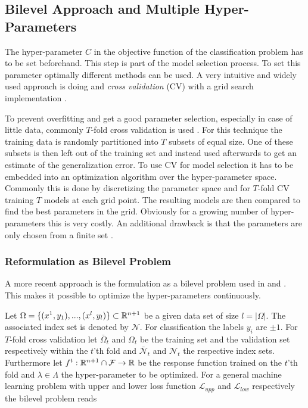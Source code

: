 \subsection{Bilevel Approach and Multiple Hyper-Parameters}


The hyper-parameter \(C\) in the objective function of the classification problem has to be set beforehand. This step is part of the model selection process.
To set this parameter optimally different methods can be used.
A very intuitive and widely used approach is doing  and \emph{cross validation} (CV) with a grid search implementation \cite[p. 30]{Kunapuli2008}.

To prevent overfitting and get a good parameter selection, especially in case of little data, commonly \(T\)-fold cross validation is used \cite[p. 30]{Kunapuli2008}.
For this technique the training data is randomly partitioned into \(T\) subsets of equal size. One of these subsets is then left out of the training set and instead used afterwards to get an estimate of the generalization error. 
To use CV for model selection it has to be embedded into an optimization algorithm over the hyper-parameter space. 
Commonly this is done by discretizing the parameter space and for \(T\)-fold CV training \(T\) models at each grid point. The resulting models are then compared to find the best parameters in the grid.
Obviously for a growing number of hyper-parameters this is very costly. An additional drawback is that the parameters are only chosen from a finite set \cite[p. 30]{Kunapuli2008}.

\subsubsection{Reformulation as Bilevel Problem}

A more recent approach is the formulation as a bilevel problem used in \cite{Kunapuli2008} and \cite{Moore2011}.
This makes it possible to optimize the hyper-parameters continuously.


Let \(\Omega = \{(x^1,y_1),...,(x^l,y_l)\} \subset \mathbb{R}^{n+1}\) be a given data set of size \(l = |\Omega|\). The associated index set is denoted by \(\mathcal{N}\). For classification the labels \(y_i\) are \(\pm1\).
For \(T\)-fold cross validation let \(\bar{\Omega}_t\) and \(\Omega_t\) be the training set and the validation set respectively within the \(t\)'th fold and \(\bar{\mathcal{N}}_t\) and \(\mathcal{N}_t\) the respective index sets.
Furthermore let \(f^t:\mathbb{R}^{n+1}\cap\mathcal{F} \to \mathbb{R}\) be the response function trained on the \(t\)'th fold and \(\lambda \in \Lambda\) the hyper-parameter to be optimized.
For a general machine learning problem with upper and lower loss function \(\mathcal{L}_{upp}\) and \(\mathcal{L}_{low}\) respectively the bilevel problem reads
 
